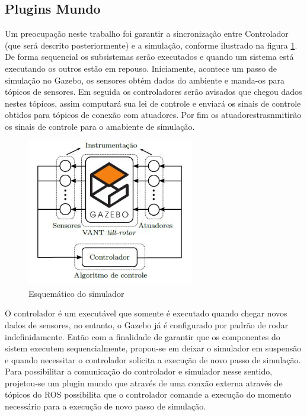 \subsection{Plugins Mundo}

Um preocupação neste trabalho foi garantir a sincronização entre Controlador (que será descrito posteriormente) e a simulação, conforme ilustrado na figura \ref{flow.jpg}. De forma sequencial os subsistemas serão executados e quando um sistema está executando os outros estão em repouso. Iniciamente, acontece um passo de simulação no Gazebo, os sensores obtém dados do ambiente e manda-os para tópicos de sensores. Em seguida os controladores serão avisados que chegou dados nestes tópicos, assim computará sua lei de controle e enviará os sinais de controle obtidos para tópicos de conexão com atuadores. Por fim os atuadorestrasnmitirão os sinais de controle para o amabiente de simulação.


\begin{figure}[H]
\centering
\includegraphics[width=0.65\textwidth]{figuras/flow.jpg}
\caption{Esquemático do simulador}
\label{flow.jpg}
\end{figure}


O controlador é um executável que somente é executado quando chegar novos dados de sensores, no entanto, o Gazebo já é configurado por padrão de rodar indefinidamente. Então com a finalidade de garantir que os componentes do sistem executem sequencialmente, propou-se em deixar o simulador em suspensão e quando necessitar o controlador solicita a execução de novo passo de simulação. Para possibilitar a comunicação do controlador e simulador nesse sentido, projetou-se um plugin mundo que através de uma conxão externa através de tópicos do ROS possibilita que o controlador comande a execução do momento necessário para a execução de novo passo de simulação.

